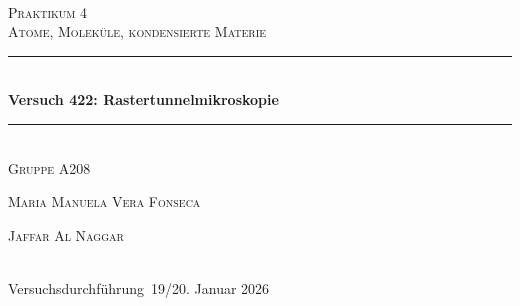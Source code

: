

\setlength\headheight{24pt}
\setlength\footheight{15pt}
\chead{}						%
\ohead{\textbf{\headmark}}		%
\cfoot*{\pagemark}				%
\renewcommand*\chapterheadstartvskip{\vspace*{-1cm}}




\begin{titlepage}
\newcommand{\HRule}{\rule{\linewidth}{0.5mm}}
\center
\textsc{\LARGE }\\[1.5cm] %
\textsc{\LARGE Praktikum 4}\\[0.5cm] %
\textsc{\large Atome, Moleküle, kondensierte Materie}\\[0.5cm] %

\HRule \\[0.4cm]
{ \huge \bfseries Versuch 422: Rastertunnelmikroskopie }\\[0.4cm] %
\HRule \\[0.2cm]
\Large{\textsc{Gruppe A208}}\\[0.2cm]
 
\begin{minipage}{0.4\textwidth}
\vspace{0.7em}
\begin{flushleft} \large
\textsc{Maria Manuela Vera Fonseca} %
\end{flushleft}
\end{minipage}
\begin{minipage}{0.4\textwidth}
\begin{flushright} \large
\textsc{Jaffar Al Naggar}
\end{flushright}
\end{minipage}\\[2.0cm]

{\large Versuchsdurchführung\, 19/20. Januar 2026 }\\[8cm] %


\end{titlepage}
